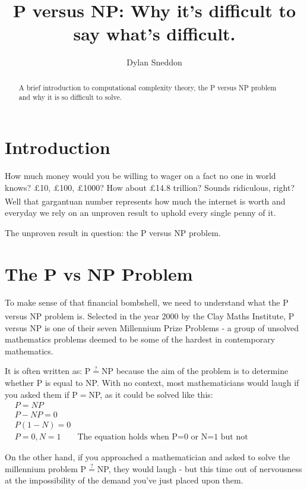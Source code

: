 \documentclass[twoside,10pt]{article}
\title{P versus NP: Why it's difficult to say what's difficult.}
\author{Dylan Sneddon}
\date{}
\begin{document}
\maketitle
\vspace{-0.75cm} %
\begin{abstract}
A brief introduction to computational complexity theory, the P versus NP problem and why it is so difficult to solve.
\end{abstract}

\section{Introduction}
How much money would you be willing to wager on a fact no one in world knows? £10, £100, £1000? How about £14.8 trillion? Sounds ridiculous, right? Well that gargantuan number represents how much the internet is worth\textsuperscript{\cite{cisco13}} and everyday we rely on an unproven result to uphold every single penny of it.

\begin{center} \centering The unproven result in question: the P versus NP problem.\end{center}

\section{The P vs NP Problem}
To make sense of that financial bombshell, we need to understand what the P versus NP problem is. Selected in the year 2000 by the Clay Maths Institute\textsuperscript{\cite{claymath}}, P versus NP is one of their seven Millennium Prize Problems - a group of unsolved mathematics problems deemed to be some of the hardest in contemporary mathematics. 

It is often written as: P$\stackrel{?}{=}$NP because the aim of the problem is to determine whether P is equal to NP. With no context, most mathematicians would laugh if you asked them if P$=$NP, as it could be solved like this:
\begin{align*}
    &P=NP\\
    &P-NP=0\\
    &P(1-N)=0\\
    &P=0,N=1
    &\text{The equation holds when P=0 or N=1 but not simultaneously.}
\end{align*}

On the other hand, if you approached a mathematician and asked to solve the millennium problem P$\stackrel{?}{=}$NP, they would laugh - but this time out of nervousness at the impossibility of the demand you've just placed upon them.
\end{document}
